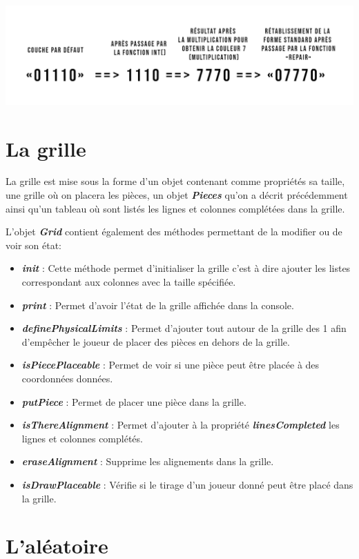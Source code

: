 \documentclass[a4paper]{report}
\begin{document}
\includegraphics{images/schema_piece.png}

\section{La grille}
La grille est mise sous la forme d'un objet contenant comme propriétés sa taille, une grille où on placera les pièces, un objet \textbf{\textit{Pieces}} qu'on a décrit précédemment ainsi qu'un tableau où sont listés les lignes et colonnes complétées dans la grille.

L'objet \textbf{\textit{Grid}} contient également des méthodes permettant de la modifier ou de voir son état:
\begin{itemize}
	\item \textbf{\textit{init}} : Cette méthode permet d'initialiser la grille c'est à dire ajouter les listes correspondant aux colonnes avec la taille spécifiée.
	\item \textbf{\textit{print}} : Permet d'avoir l'état de la grille affichée dans la console.
	\item \textbf{\textit{definePhysicalLimits}} : Permet d'ajouter tout autour de la grille des 1 afin d'empêcher le joueur de placer des pièces en dehors de la grille.
	\item \textbf{\textit{isPiecePlaceable}} : Permet de voir si une pièce peut être placée à des coordonnées données.
	\item \textbf{\textit{putPiece}} : Permet de placer une pièce dans la grille.
	\item \textbf{\textit{isThereAlignment}} : Permet d'ajouter à la propriété \textbf{\textit{linesCompleted}} les lignes et colonnes complétés.
	\item \textbf{\textit{eraseAlignment}} : Supprime les alignements dans la grille.
	\item \textbf{\textit{isDrawPlaceable}} : Vérifie si le tirage d'un joueur donné peut être placé dans la grille.
\end{itemize}

\section{L'aléatoire}
\end{document}
